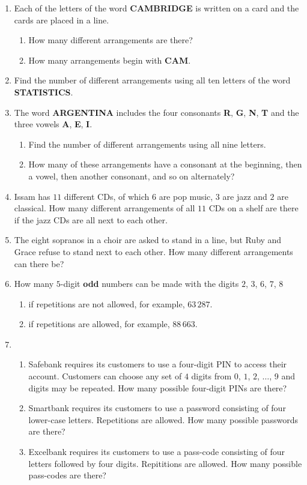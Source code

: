 \begin{enumerate}
	\item Each of the letters of the word \textbf{CAMBRIDGE} is written on a card and the cards are placed in a line.
	\begin{enumerate}
		\item How many different arrangements are there?
		\item How many arrangements begin with \textbf{CAM}.
	\end{enumerate}

  \item Find the number of different arrangements using all ten letters of the word \textbf{STATISTICS}.
  
  
  \item The word \textbf{ARGENTINA} includes the four consonants \textbf{R}, \textbf{G}, \textbf{N}, \textbf{T} and the three vowels \textbf{A}, \textbf{E},  \textbf{I}.
  \begin{enumerate}
  	\item Find the number of different arrangements using all nine letters.
  	\item How many of these arrangements have a consonant at the beginning, then a vowel, then another consonant, and so on alternately? 
  \end{enumerate}

\item Issam has $11$ different CDs, of which $6$ are pop music, $3$ are jazz and $2$ are classical.
How many different arrangements of all $11$ CDs on a shelf are there if the jazz CDs are all next to each other.

\item The eight sopranos in a choir are asked to stand in a line, but Ruby and Grace refuse to stand next to each other. How many different arrangements can there be?

\item How many $5$-digit \textbf{odd} numbers can be made with the digits $2$, $3$, $6$, $7$, $8$

\begin{enumerate}
	\item if repetitions are not allowed, for example, $63\,287$.
	\item if repetitions are allowed, for example, $88\,663$.
\end{enumerate}


\item  \begin{enumerate}
	\item Safebank requires its customers to use a four-digit PIN to access their account. Customers can choose any set of $4$ digits from $0$, $1$, $2$, $\ldots$, 9 and digits may be repeated. How many possible four-digit PINs are there?
	\item Smartbank requires its customers to use a password consisting of four lower-case letters. Repetitions are allowed. How many  possible passwords are there?
	\item Excelbank requires its customers to use a pass-code consisting of four letters followed by four digits. Repititions are allowed. How many possible pass-codes are there?
\end{enumerate}


\end{enumerate}
